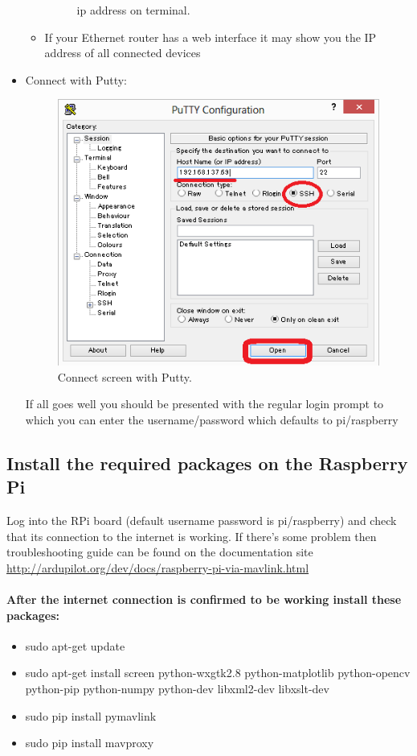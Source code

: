 \documentclass[11pt,a4paper]{article}
\begin{document}
\begin{itemize}
\begin{itemize}
\begin{figure}[H]
				\caption{ip address on terminal.}
			\end{figure}
		\item If your Ethernet router has a web interface it may show you the IP address of all connected devices
	\end{itemize}	\item Connect with Putty:
		\begin{figure}[H]
	 	\centering
		\includegraphics[scale=0.37]{putty}
	 	\caption{Connect screen with Putty.}
\end{figure}
	If all goes well you should be presented with the regular login prompt to which you can enter the username/password which defaults to pi/raspberry
	 \end{itemize}
	 \subsection{Install the required packages on the Raspberry Pi}
	 Log into the RPi board (default username password is pi/raspberry) and check that its connection to the internet is working. If there's some problem then troubleshooting guide can be found on the documentation site \url{http://ardupilot.org/dev/docs/raspberry-pi-via-mavlink.html}
	 \paragraph{After the internet connection is confirmed to be working install these packages:}
	 \begin{itemize}
	 	\item sudo apt-get update
	 	\item sudo apt-get install screen python-wxgtk2.8 python-matplotlib python-opencv python-pip python-numpy python-dev libxml2-dev libxslt-dev
	 	\item sudo pip install pymavlink
	 	\item sudo pip install mavproxy
	 \end{itemize}
\end{document}
